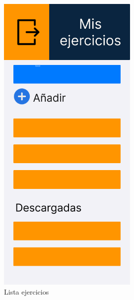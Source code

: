 \begin{figure}[H]
   \centering
    \includegraphics[width=0.6\textwidth]{fotos/Frame 40.png}
    \caption{Lista ejercicios}
    \label{fig:Lista ejercicios}
\end{figure}
